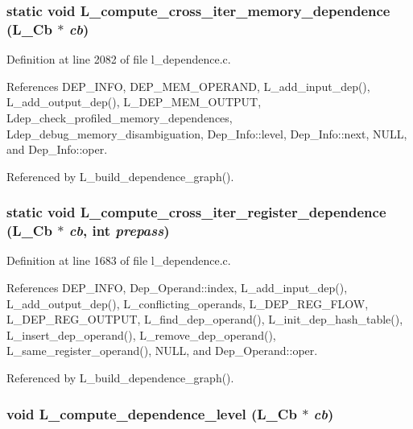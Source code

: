 \subsubsection{\setlength{\rightskip}{0pt plus 5cm}static void L\_\-compute\_\-cross\_\-iter\_\-memory\_\-dependence (L\_\-Cb $\ast$ {\em cb})\hspace{0.3cm}{\tt  [static]}}\label{l__dependence_8c_0cbb9aeb94a9a195899995d0ad84eff7}




Definition at line 2082 of file l\_\-dependence.c.

References DEP\_\-INFO, DEP\_\-MEM\_\-OPERAND, L\_\-add\_\-input\_\-dep(), L\_\-add\_\-output\_\-dep(), L\_\-DEP\_\-MEM\_\-OUTPUT, Ldep\_\-check\_\-profiled\_\-memory\_\-dependences, Ldep\_\-debug\_\-memory\_\-disambiguation, Dep\_\-Info::level, Dep\_\-Info::next, NULL, and Dep\_\-Info::oper.

Referenced by L\_\-build\_\-dependence\_\-graph().
\subsubsection{\setlength{\rightskip}{0pt plus 5cm}static void L\_\-compute\_\-cross\_\-iter\_\-register\_\-dependence (L\_\-Cb $\ast$ {\em cb}, int {\em prepass})\hspace{0.3cm}{\tt  [static]}}\label{l__dependence_8c_19ed66f522ef76bc785bcf1b6900c6f8}




Definition at line 1683 of file l\_\-dependence.c.

References DEP\_\-INFO, Dep\_\-Operand::index, L\_\-add\_\-input\_\-dep(), L\_\-add\_\-output\_\-dep(), L\_\-conflicting\_\-operands, L\_\-DEP\_\-REG\_\-FLOW, L\_\-DEP\_\-REG\_\-OUTPUT, L\_\-find\_\-dep\_\-operand(), L\_\-init\_\-dep\_\-hash\_\-table(), L\_\-insert\_\-dep\_\-operand(), L\_\-remove\_\-dep\_\-operand(), L\_\-same\_\-register\_\-operand(), NULL, and Dep\_\-Operand::oper.

Referenced by L\_\-build\_\-dependence\_\-graph().
\subsubsection{\setlength{\rightskip}{0pt plus 5cm}void L\_\-compute\_\-dependence\_\-level (L\_\-Cb $\ast$ {\em cb})}\label{l__dependence_8c_f669d306bab65f7ef2c088b8c7b36d0b}




